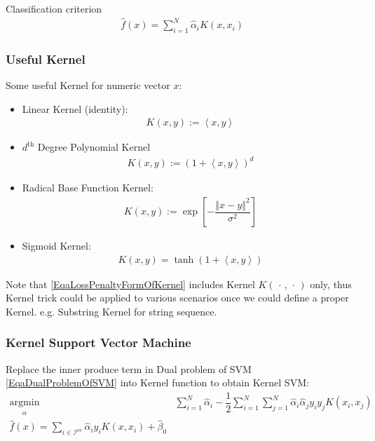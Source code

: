     Classification criterion
    \begin{align}
        \hat{f}(x) =\sum_{i=1}^N\hat{\alpha }_iK(x,x_i)
    \end{align}
    

\subsubsection{Useful Kernel}
    Some useful Kernel for numeric vector $ x $:
    \begin{itemize}[topsep=2pt,itemsep=0pt]
        \item Linear Kernel (identity):
        \begin{align}
            K(x,y):=\left\langle x,y \right\rangle 
        \end{align}        
        \item $ d^\mathrm{th}  $ Degree Polynomial Kernel
        \begin{align}
            K(x,y):=\left(1+\left\langle x,y \right\rangle \right)^d
        \end{align}
        \item Radical Base Function Kernel: 
        \begin{align}
            K(x,y):=\exp\left[ -\dfrac{\left\Vert x-y \right\Vert ^2}{\sigma ^2} \right] 
        \end{align}
        \item Sigmoid Kernel: 
        \begin{align}
            K(x,y)=\tanh\left(1+\left\langle x,y \right\rangle \right) 
        \end{align}
    \end{itemize}

    Note that \autoref{EqaLossPenaltyFormOfKernel} includes Kernel $ K(\,\cdot \,,\,\cdot \,) $ only, thus Kernel trick could be applied to various scenarios once we could define a proper Kernel. e.g. Substring Kernel for string sequence.


\subsubsection{Kernel Support Vector Machine}
    Replace the inner produce term in Dual problem of SVM \autoref{EqaDualProblemOfSVM} into Kernel function to obtain Kernel SVM:
    \begin{align}
         \mathop{\arg\min}\limits_{\hat{\alpha} }& \sum_{i=1}^N\hat{\alpha} _i-\dfrac{1}{2}\sum_{i=1}^N\sum_{j=1}^N\hat{\alpha} _i\hat{\alpha} _jy_iy_j K(x_i,x_j) \\
         \hat{f}(x)=\sum_{i\in\mathcal{I}^\mathrm{sv} }\hat{\alpha }_iy_iK(x,x_i)+\hat{\beta }_0
    \end{align}

